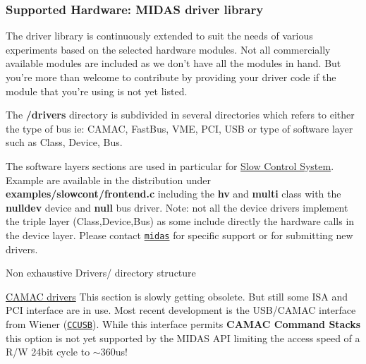 \label{index_end}
\hypertarget{index_end}{}


\par




\par
 \subsubsection{Supported Hardware: MIDAS driver library}\label{FE_Hardware}
\par
 

\label{FE_Hardware_idx_Hardware_driver_library}
\hypertarget{FE_Hardware_idx_Hardware_driver_library}{}


The driver library is continuously extended to suit the needs of various experiments based on the selected hardware modules. Not all commercially available modules are included as we don't have all the modules in hand. But you're more than welcome to contribute by providing your driver code if the module that you're using is not yet listed.

The {\bfseries /drivers} directory is subdivided in several directories which refers to either the type of bus ie: CAMAC, FastBus, VME, PCI, USB or type of software layer such as Class, Device, Bus.

The software layers sections are used in particular for \hyperlink{FE_Slow_Control_system}{Slow Control System}. Example are available in the distribution under {\bfseries examples/slowcont/frontend.c} including the {\bfseries hv} and {\bfseries multi} class with the {\bfseries nulldev} device and {\bfseries null} bus driver. Note: not all the device drivers implement the triple layer (Class,Device,Bus) as some include directly the hardware calls in the device layer. Please contact \href{mailto:midas@psi.ch, midas@triumf.ca?subject=VME support}{\tt midas} for specific support or for submitting new drivers.

\begin{center} Non exhaustive Drivers/ directory structure  \end{center} 


\begin{DoxyItemize}
\item \hyperlink{FE_Hardware_CAMAC_drivers}{CAMAC drivers} This section is slowly getting obsolete. But still some ISA and PCI interface are in use. Most recent development is the USB/CAMAC interface from Wiener (\href{http://www.wiener-d.com/M/17/7.html}{\tt CCUSB}). While this interface permits {\bfseries CAMAC Command Stacks} this option is not yet supported by the MIDAS API limiting the access speed of a R/W 24bit cycle to $\sim$360us!
\end{DoxyItemize}


